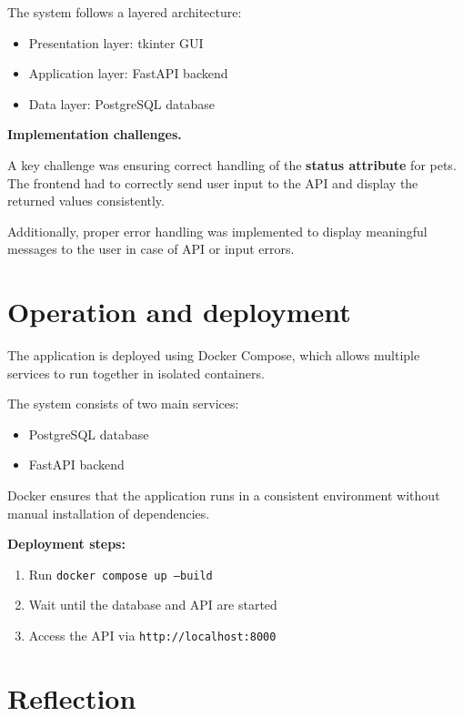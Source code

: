 \documentclass[11pt,a4paper]{article}
\begin{document}
The system follows a layered architecture:
\begin{itemize}
\item Presentation layer: tkinter GUI
\item Application layer: FastAPI backend
\item Data layer: PostgreSQL database
\end{itemize}

\textbf{Implementation challenges.}

A key challenge was ensuring correct handling of the \textbf{status attribute}
for pets. The frontend had to correctly send user input to the API and display
the returned values consistently.

Additionally, proper error handling was implemented to display meaningful
messages to the user in case of API or input errors.
\section{Operation and deployment}


The application is deployed using Docker Compose, which allows multiple services
to run together in isolated containers.

The system consists of two main services:
\begin{itemize}
\item PostgreSQL database
\item FastAPI backend
\end{itemize}

Docker ensures that the application runs in a consistent environment without
manual installation of dependencies.

\textbf{Deployment steps:}
\begin{enumerate}
\item Run \texttt{docker compose up --build}
\item Wait until the database and API are started
\item Access the API via \texttt{http://localhost:8000}
\end{enumerate}



\section{Reflection}
\end{document}
